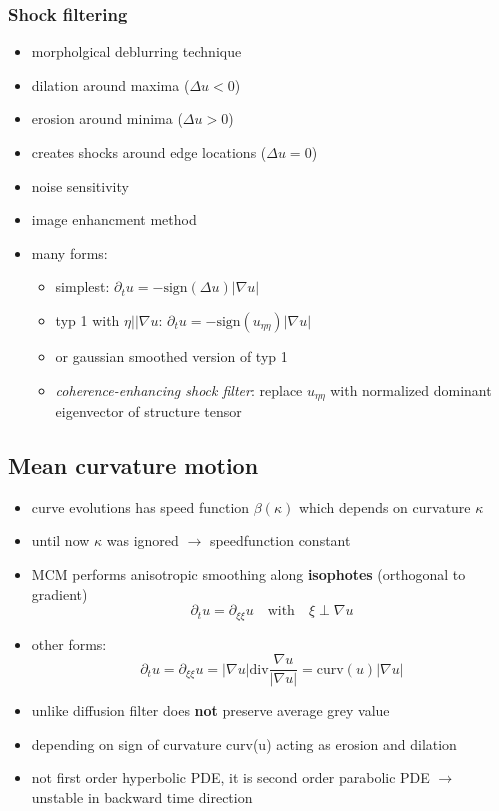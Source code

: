 \documentclass[11pt]{article}
\begin{document}
\subsubsection{Shock filtering}
\label{sec-8-2-4}
\begin{itemize}
\item morpholgical deblurring technique
\item dilation around maxima ($\Delta u < 0$)
\item erosion around minima ($\Delta u > 0$)
\item creates shocks around edge locations ($\Delta u = 0$)
\item noise sensitivity
\item image enhancment method
\item many forms:
\begin{itemize}
\item simplest: $\partial_t u = -\text{sign}(\Delta u) |\nabla u|$
\item typ 1 with $\eta || \nabla u$: $\partial_t u = -\text{sign}(u_{\eta\eta}) |\nabla u|$
\item or gaussian smoothed version of typ 1
\item \emph{coherence-enhancing shock filter}: replace $u_{\eta\eta}$ with normalized dominant
eigenvector of structure tensor
\end{itemize}
\end{itemize}
\subsection{Mean curvature motion}
\label{sec-8-3}
\begin{itemize}
\item curve evolutions has speed function $\beta(\kappa)$ which depends on curvature $\kappa$
\item until now $\kappa$ was ignored $\rightarrow$ speedfunction constant
\item MCM performs anisotropic smoothing along \textbf{isophotes} (orthogonal to gradient)
     \[ \partial_t u = \partial_{\xi\xi}u \quad \text{with} \quad \xi \perp \nabla u \]
\item other forms:
     \[ \partial_t u = \partial_{\xi\xi}u = |\nabla u| \text{div}\frac{\nabla u}{|\nabla u|} 
        =  \text{curv}(u) |\nabla u| \]
\item unlike diffusion filter does \textbf{not} preserve average grey value
\item depending on sign of curvature curv(u) acting as erosion and dilation
\item not first order hyperbolic PDE, it is second order parabolic PDE $\rightarrow$
unstable in backward time direction
\end{itemize}
\end{document}
